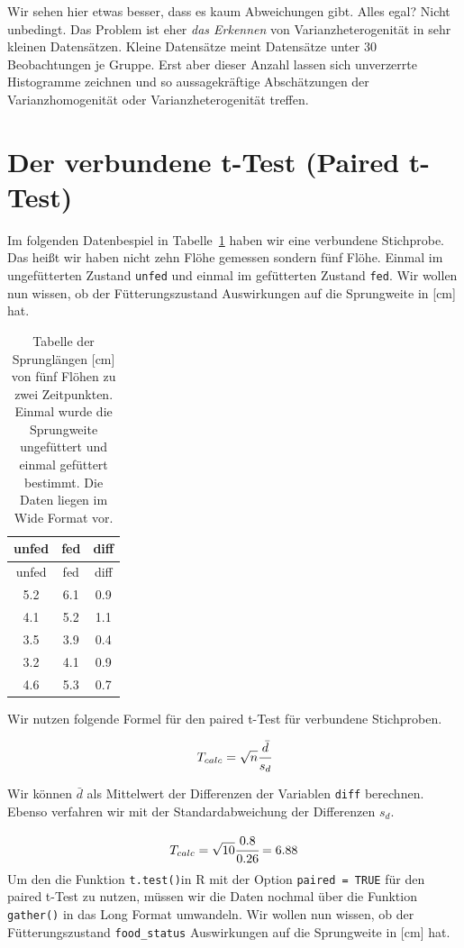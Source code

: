 \documentclass[
  letterpaper,
  DIV=11,
  oneside]{scrreport}
\begin{document}
Wir sehen hier etwas besser, dass es kaum Abweichungen gibt. Alles egal?
Nicht unbedingt. Das Problem ist eher \emph{das Erkennen} von
Varianzheterogenität in sehr kleinen Datensätzen. Kleine Datensätze
meint Datensätze unter 30 Beobachtungen je Gruppe. Erst aber dieser
Anzahl lassen sich unverzerrte Histogramme zeichnen und so
aussagekräftige Abschätzungen der Varianzhomogenität oder
Varianzheterogenität treffen.

\hypertarget{der-verbundene-t-test-paired-t-test}{%
\section{Der verbundene t-Test (Paired
t-Test)}\label{der-verbundene-t-test-paired-t-test}}

Im folgenden Datenbespiel in Tabelle~\ref{tbl-data-ttest-paired} haben
wir eine verbundene Stichprobe. Das heißt wir haben nicht zehn Flöhe
gemessen sondern fünf Flöhe. Einmal im ungefütterten Zustand
\texttt{unfed} und einmal im gefütterten Zustand \texttt{fed}. Wir
wollen nun wissen, ob der Fütterungszustand Auswirkungen auf die
Sprungweite in {[}cm{]} hat.

\hypertarget{tbl-data-ttest-paired}{}
\begin{longtable}[]{@{}ccc@{}}
\caption{\label{tbl-data-ttest-paired}Tabelle der Sprunglängen {[}cm{]}
von fünf Flöhen zu zwei Zeitpunkten. Einmal wurde die Sprungweite
ungefüttert und einmal gefüttert bestimmt. Die Daten liegen im Wide
Format vor.}\tabularnewline
\toprule()
unfed & fed & diff \\
\midrule()
\endfirsthead
\toprule()
unfed & fed & diff \\
\midrule()
\endhead
5.2 & 6.1 & 0.9 \\
4.1 & 5.2 & 1.1 \\
3.5 & 3.9 & 0.4 \\
3.2 & 4.1 & 0.9 \\
4.6 & 5.3 & 0.7 \\
\bottomrule()
\end{longtable}

Wir nutzen folgende Formel für den paired t-Test für verbundene
Stichproben.

\[
T_{calc} = \sqrt{n}\cfrac{\bar{d}}{s_d}
\]

Wir können \(\bar{d}\) als Mittelwert der Differenzen der Variablen
\texttt{diff} berechnen. Ebenso verfahren wir mit der Standardabweichung
der Differenzen \(s_d\).

\[
T_{calc} = \sqrt{10}\cfrac{0.8}{0.26} = 6.88
\] Um den die Funktion \texttt{t.test()}in R mit der Option
\texttt{paired\ =\ TRUE} für den paired t-Test zu nutzen, müssen wir die
Daten nochmal über die Funktion \texttt{gather()} in das Long Format
umwandeln. Wir wollen nun wissen, ob der Fütterungszustand
\texttt{food\_status} Auswirkungen auf die Sprungweite in {[}cm{]} hat.
\end{document}
